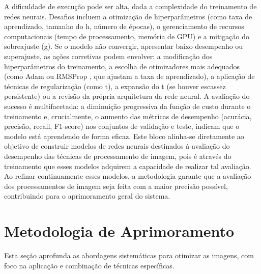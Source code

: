 A dificuldade de execução pode ser alta, dada a complexidade do treinamento de redes neurais. Desafios incluem a otimização de hiperparâmetros (como taxa de aprendizado, tamanho do h, número de épocas), o gerenciamento de recursos computacionais (tempo de processamento, memória de GPU) e a mitigação do sobreajuste (g). Se o modelo não convergir, apresentar baixo desempenho ou superajuste, as ações corretivas podem envolver: a modificação dos hiperparâmetros do treinamento, a escolha de otimizadores mais adequados (como Adam \cite{Kingma2014} ou RMSProp \cite{Tieleman2012}, que ajustam a taxa de aprendizado), a aplicação de técnicas de regularização (como t), a expansão do t (se houver escassez persistente) ou a revisão da própria arquitetura da rede neural. A avaliação do sucesso é multifacetada: a diminuição progressiva da função de custo durante o treinamento e, crucialmente, o aumento das métricas de desempenho (acurácia, precisão, recall, F1-score) nos conjuntos de validação e teste, indicam que o modelo está aprendendo de forma eficaz. Este bloco alinha-se diretamente ao objetivo de construir modelos de redes neurais destinados à avaliação do desempenho das técnicas de processamento de imagem, pois é através do treinamento que esses modelos adquirem a capacidade de realizar tal avaliação. Ao refinar continuamente esses modelos, a metodologia garante que a avaliação dos processamentos de imagem seja feita com a maior precisão possível, contribuindo para o aprimoramento geral do sistema.

\section{Metodologia de Aprimoramento}

Esta seção aprofunda as abordagens sistemáticas para otimizar as imagens, com foco na aplicação e combinação de técnicas específicas.

